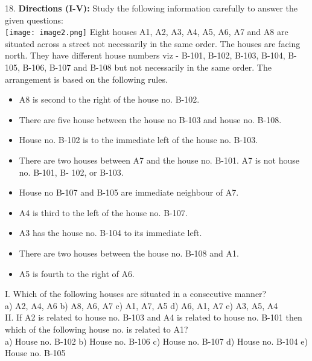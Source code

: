 \documentclass[
]{article}
\begin{document}
18. \textbf{Directions (I-V):} Study the following information carefully to answer the given questions:\\
\texttt{[image: image2.png]}
Eight houses A1, A2, A3, A4, A5, A6, A7 and A8 are situated across a street not necessarily in
the same order. The houses are facing north. They have different house numbers viz - B-101,
B-102, B-103, B-104, B-105, B-106, B-107 and B-108 but not necessarily in the same order. The
arrangement is based on the following rules.\\
\begin{itemize}
\item A8 is second to the right of the house no. B-102.
\item There are five house between the house no B-103 and house no. B-108.
\item House no. B-102 is to the immediate left of the house no. B-103.

\item There are two houses between A7 and the house no. B-101. A7 is not house no. B-101, B-
102, or B-103.

\item House no B-107 and B-105 are immediate neighbour of A7.
\item A4 is third to the left of the house no. B-107.
\item A3 has the house no. B-104 to its immediate left.
\item There are two houses between the house no. B-108 and A1.
\item A5 is fourth to the right of A6.
\end{itemize}

I. Which of the following houses are situated in a consecutive manner?\\
a) A2, A4, A6 \hspace{2mm}b) A8, A6, A7 \hspace{2mm}c) A1, A7, A5 \hspace{2mm}d) A6, A1, A7 \hspace{2mm}e) A3, A5, A4\\

II. If A2 is related to house no. B-103 and A4 is related to house no. B-101 then which of the
following house no. is related to A1?\\
a) House no. B-102 \hspace{2mm}b) House no. B-106 \hspace{2mm}c) House no. B-107
\hspace{2mm}d) House no. B-104 \hspace{2mm}e) House no. B-105\\
\end{document}
